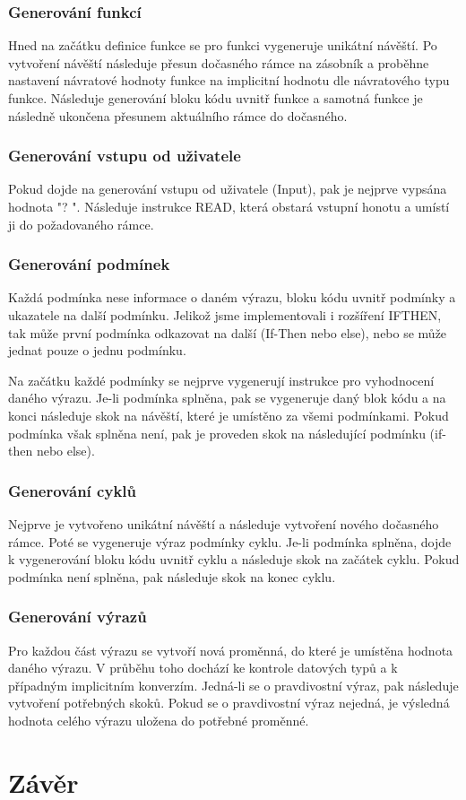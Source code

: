 \documentclass[11pt,a4paper]{article}
\begin{document}
    \subsubsection{Generování funkcí}
    Hned na začátku definice funkce se pro funkci vygeneruje unikátní návěští. Po vytvoření návěští následuje přesun dočasného rámce na zásobník a proběhne nastavení návratové hodnoty funkce na implicitní hodnotu dle návratového typu funkce. Následuje generování bloku kódu uvnitř funkce a samotná funkce je následně ukončena přesunem aktuálního rámce do dočasného.

    \subsubsection{Generování vstupu od uživatele}
    Pokud dojde na generování vstupu od uživatele (Input), pak je nejprve vypsána hodnota "? ". Následuje instrukce READ, která obstará vstupní honotu a umístí ji do požadovaného rámce.

    \subsubsection{Generování podmínek}
    Každá podmínka nese informace o daném výrazu, bloku kódu uvnitř podmínky a ukazatele na další podmínku. Jelikož jsme implementovali i rozšíření IFTHEN, tak může první podmínka odkazovat na další (If-Then nebo else), nebo se může jednat pouze o jednu podmínku.

    Na začátku každé podmínky se nejprve vygenerují instrukce pro vyhodnocení daného výrazu. Je-li podmínka splněna, pak se vygeneruje daný blok kódu a na konci následuje skok na návěští, které je umístěno za všemi podmínkami. Pokud podmínka však splněna není, pak je proveden skok na následující podmínku (if-then nebo else).

    \subsubsection{Generování cyklů}
    Nejprve je vytvořeno unikátní návěští a následuje vytvoření nového dočasného rámce. Poté se vygeneruje výraz podmínky cyklu. Je-li podmínka splněna, dojde k vygenerování bloku kódu uvnitř cyklu a následuje skok na začátek cyklu. Pokud podmínka není splněna, pak následuje skok na konec cyklu.

    \subsubsection{Generování výrazů}
    Pro každou část výrazu se vytvoří nová proměnná, do které je umístěna hodnota daného výrazu. V průběhu toho dochází ke kontrole datových typů a k případným implicitním konverzím.
    Jedná-li se o pravdivostní výraz, pak následuje vytvoření potřebných skoků. Pokud se o pravdivostní výraz nejedná, je výsledná hodnota celého výrazu uložena do potřebné proměnné.

    \newpage

\section{Závěr}

    \newpage
    
\end{document}
